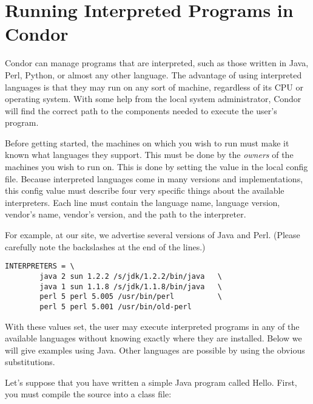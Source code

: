 \section{\label{sec:interp}Running Interpreted Programs in Condor}


Condor can manage programs that are interpreted, such as those written
in Java, Perl, Python, or almost any other language.  The advantage of
using interpreted languages is that they may run on any sort of machine,
regardless of its CPU or operating system.  With some help from the local
system administrator, Condor will find the correct path to the components
needed to execute the user's program.

Before getting started, the machines on which you wish to run must make it
known what languages they support.  This must be done by the \emph{owners}
of the machines you wish to run on.   This is done by setting the 
value in the local config file.  Because interpreted languages come in many
versions and implementations, this config value must describe four very
specific things about the available interpreters.  Each line must contain
the language name, language version, vendor's name, vendor's version, and
the path to the interpreter.

For example, at our site, we advertise several versions of Java and Perl.
(Please carefully note the backslashes at the end of the lines.)

\begin{verbatim}
INTERPRETERS = \
        java 2 sun 1.2.2 /s/jdk/1.2.2/bin/java   \
        java 1 sun 1.1.8 /s/jdk/1.1.8/bin/java   \
        perl 5 perl 5.005 /usr/bin/perl          \
        perl 5 perl 5.001 /usr/bin/old-perl
\end{verbatim}

With these values set, the user may execute interpreted programs
in any of the available languages without knowing exactly where
they are installed.  Below we will give examples using
Java.  Other languages are possible by using the obvious substitutions.

Let's suppose that you have written a simple Java program called Hello.
First, you must compile the source into a class file:

